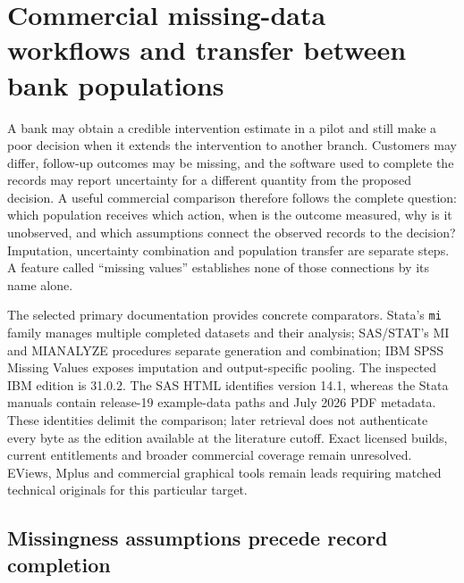 \section{Commercial missing-data workflows and transfer between bank populations}
\label{exec21:transport-scope}

A bank may obtain a credible intervention estimate in a pilot and still make a
poor decision when it extends the intervention to another branch. Customers may
differ, follow-up outcomes may be missing, and the software used to complete
the records may report uncertainty for a different quantity from the proposed
decision. A useful commercial comparison therefore follows the complete
question: which population receives which action, when is the outcome measured,
why is it unobserved, and which assumptions connect the observed records to the
decision? Imputation, uncertainty combination and population transfer are
separate steps. A feature called ``missing values'' establishes none of those
connections by its name alone.

The selected primary documentation provides concrete comparators. Stata's
\texttt{mi} family manages multiple completed datasets and their analysis;
SAS/STAT's MI and MIANALYZE procedures separate generation and combination;
IBM SPSS Missing Values exposes imputation and output-specific pooling.
The inspected IBM edition is 31.0.2. The SAS HTML identifies version 14.1,
whereas the Stata manuals contain release-19 example-data paths and July 2026
PDF metadata. These identities delimit the comparison; later retrieval does
not authenticate every byte as the edition available at the literature cutoff.
Exact licensed builds, current entitlements and broader commercial coverage
remain unresolved. EViews, Mplus and commercial graphical tools remain leads
requiring matched technical originals for this particular target.
\citep{exec21_transport_stata_mi,exec21_transport_sas_mi_intro,exec21_transport_spss_missing}

\subsection{Missingness assumptions precede record completion}
\label{exec21:transport-missingness}

